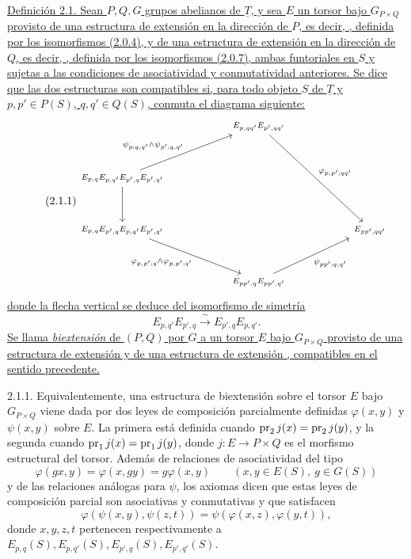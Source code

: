 \underline{Definición 2.1. Sean $P,Q,G$ grupos abelianos de
$\underline T$, y sea $E$ un torsor bajo $G_{P\times Q}$ provisto de
una estructura de extensión en la dirección de $P$, es decir,
, definida por los
isomorfismos (2.0.4), y de una estructura de extensión en la dirección
de $Q$, es decir, ,
definida por los isomorfismos (2.0.7), ambas funtoriales en $S$ y
sujetas a las condiciones de asociatividad y conmutatividad anteriores.
Se dice que las dos estructuras son compatibles si, para todo objeto
$S$ de $\underline T$ y $p,p'\in P(S)$, $q,q'\in Q(S)$, conmuta el
diagrama siguiente:}
\begin{equation}\tag{2.1.1}
\begin{tikzcd}[column sep=2.7em,row sep=3.2em,font=\scriptsize]
 && E_{p,qq'}E_{p',qq'}
    \arrow[rrdd,"{\varphi_{p,p';qq'}}"] && \\
 E_{p,q}E_{p,q'}E_{p',q}E_{p',q'}
    \arrow[rru,"{\psi_{p;q,q'}\wedge\psi_{p';q,q'}}"]
    \arrow[d,"{}"'] &&&& \\
 E_{p,q}E_{p',q}E_{p,q'}E_{p',q'}
    \arrow[rrd,"{\varphi_{p,p';q}\wedge\varphi_{p,p';q'}}"']
 &&&& E_{pp',qq'} \\
 && E_{pp',q}E_{pp',q'}
    \arrow[rru,"{\psi_{pp';q,q'}}"'] &&
\end{tikzcd}
\end{equation}
\underline{donde la flecha vertical se deduce del isomorfismo de
simetría}
\[
 E_{p,q'}E_{p',q}\xrightarrow{\ \sim\ }E_{p',q}E_{p,q'}.
\]
\underline{Se llama \emph{biextensión} de $(P,Q)$ por $G$ a un torsor
$E$ bajo $G_{P\times Q}$ provisto de una estructura de extensión
 y de una estructura de
extensión , compatibles
en el sentido precedente.}


2.1.1. Equivalentemente, una estructura de biextensión sobre el torsor
$E$ bajo $G_{P\times Q}$ viene dada por dos leyes de composición
parcialmente definidas $\varphi(x,y)$ y $\psi(x,y)$ sobre $E$. La
primera está definida cuando $\operatorname{pr}_2j(x)=\operatorname{pr}_2j(y)$, y la segunda cuando
$\operatorname{pr}_1j(x)=\operatorname{pr}_1j(y)$, donde $j:E\longrightarrow P\times Q$ es el
morfismo estructural del torsor. Además de relaciones de asociatividad
del tipo
\begin{equation}\tag{2.1.1.1}
 \varphi(gx,y)=\varphi(x,gy)=g\varphi(x,y)
 \qquad(x,y\in E(S),\ g\in G(S))
\end{equation}
y de las relaciones análogas para $\psi$, los axiomas dicen que estas
leyes de composición parcial son asociativas y conmutativas y que
satisfacen
\begin{equation}\tag{2.1.1.2}
 \varphi(\psi(x,y),\psi(z,t))
 =\psi(\varphi(x,z),\varphi(y,t)),
\end{equation}
donde $x,y,z,t$ pertenecen respectivamente a
$E_{p,q}(S),E_{p,q'}(S),E_{p',q}(S),E_{p',q'}(S)$.


